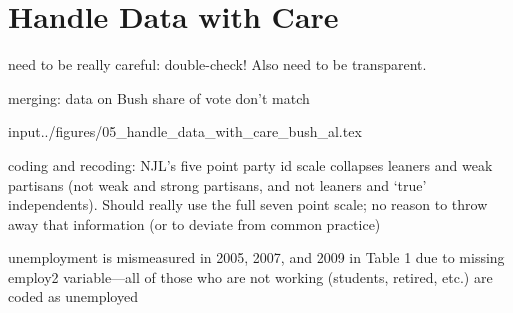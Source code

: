 

\section{Handle Data with Care}

need to be really careful: double-check!  Also need to be transparent.

merging: data on Bush share of vote don't match

input{../figures/05_handle_data_with_care_bush_al.tex}

coding and recoding: NJL's five point party id scale collapses leaners and weak partisans (not weak and strong partisans, and not leaners and `true' independents).  Should really use the full seven point scale; no reason to throw away that information (or to deviate from common practice)

unemployment is mismeasured in 2005, 2007, and 2009 in Table 1 due to missing employ2 variable---all of those who are not working (students, retired, etc.) are coded as unemployed
